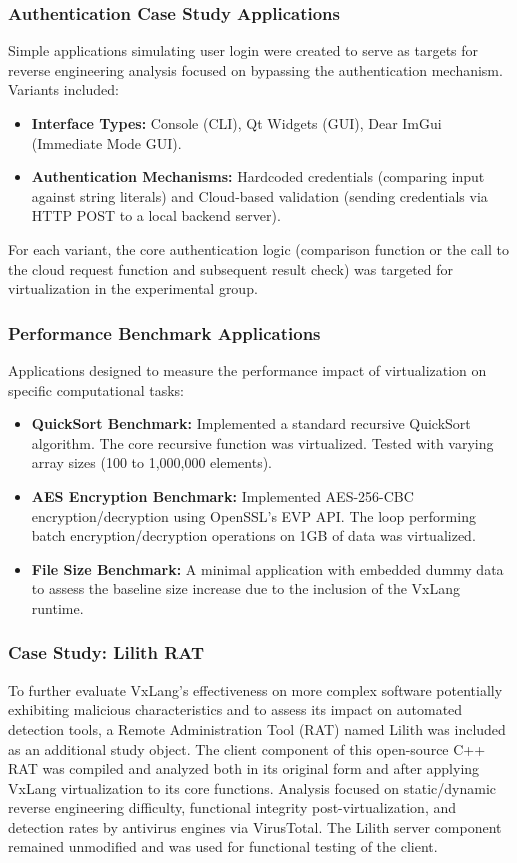 \subsubsection{Authentication Case Study Applications} Simple applications simulating user login were created to serve as targets for reverse engineering analysis focused on bypassing the authentication mechanism. Variants included:
    \begin{itemize}
        \item \textbf{Interface Types:} Console (CLI), Qt Widgets (GUI), Dear ImGui (Immediate Mode GUI).
        \item \textbf{Authentication Mechanisms:} Hardcoded credentials (comparing input against string literals) and Cloud-based validation (sending credentials via HTTP POST to a local backend server).
    \end{itemize}
    For each variant, the core authentication logic (comparison function or the call to the cloud request function and subsequent result check) was targeted for virtualization in the experimental group.

\subsubsection{Performance Benchmark Applications} Applications designed to measure the performance impact of virtualization on specific computational tasks:
    \begin{itemize}
        \item \textbf{QuickSort Benchmark:} Implemented a standard recursive QuickSort algorithm. The core recursive function was virtualized. Tested with varying array sizes (100 to 1,000,000 elements).
        \item \textbf{AES Encryption Benchmark:} Implemented AES-256-CBC encryption/decryption using OpenSSL's EVP API. The loop performing batch encryption/decryption operations on 1GB of data was virtualized.
        \item \textbf{File Size Benchmark:} A minimal application with embedded dummy data to assess the baseline size increase due to the inclusion of the VxLang runtime.
    \end{itemize}

\subsubsection{Case Study: Lilith RAT}
To further evaluate VxLang's effectiveness on more complex software potentially exhibiting malicious characteristics and to assess its impact on automated detection tools, a Remote Administration Tool (RAT) named Lilith \cite{LilithRAT} was included as an additional study object. The client component of this open-source C++ RAT was compiled and analyzed both in its original form and after applying VxLang virtualization to its core functions. Analysis focused on static/dynamic reverse engineering difficulty, functional integrity post-virtualization, and detection rates by antivirus engines via VirusTotal. The Lilith server component remained unmodified and was used for functional testing of the client.

